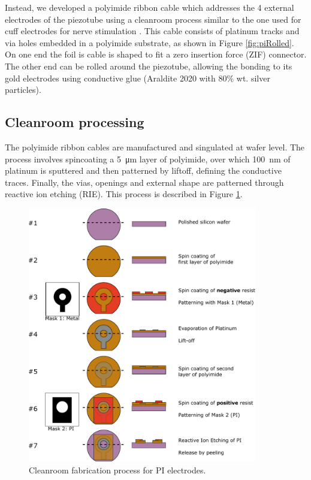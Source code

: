 Instead, we developed a polyimide ribbon cable which addresses the 4 external electrodes of the piezotube using a cleanroom process similar to the one used for cuff electrodes for nerve stimulation \cite{Rodriguez2000}. This cable consists of platinum tracks and via holes embedded in a polyimide substrate, as shown in Figure \ref{fig:piRolled}.
On one end the foil is cable is shaped to fit a zero insertion force (ZIF) connector. The other end can be rolled around the piezotube, allowing the bonding to its gold electrodes using conductive glue (Araldite 2020 with 80\% wt. silver particles).


\subsection{Cleanroom processing}
The polyimide ribbon cables are manufactured and singulated at wafer level. The process involves spincoating a \SI{5}{\micro\meter} layer of polyimide, over which \SI{100}{\nano\meter} of platinum is sputtered and then patterned by liftoff, defining the conductive traces. Finally, the vias, openings and external shape are patterned through reactive ion etching (RIE). This process is described in Figure \ref{fig:piProcess}.


\begin{figure}[h!]\centering \includegraphics[width=10cm]{figures/40_Fabrication/PI/processV.pdf}
      \caption{Cleanroom fabrication process for PI electrodes.}
      \label{fig:piProcess}
\end{figure}
%

